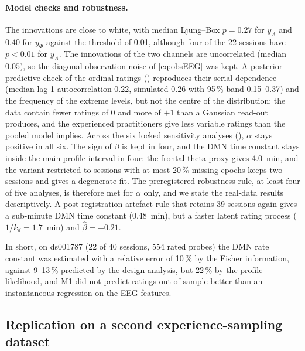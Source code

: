 \documentclass[12pt,a4paper]{article}
\theoremstyle{plain}
\theoremstyle{definition}
\theoremstyle{remark}
\newcommand{\kd}{k_{d}}
\begin{document}
\paragraph{Model checks and robustness.} The innovations are close to white, with median Ljung--Box \citep{Ljung1978} $p=0.27$ for $y_A$ and $0.40$ for $y_\Phi$ against the threshold of 0.01, although four of the 22 sessions have $p<0.01$ for $y_A$. The innovations of the two channels are uncorrelated (median $0.05$), so the diagonal observation noise of \eqref{eq:obsEEG} was kept. A posterior predictive check of the ordinal ratings () reproduces their serial dependence (median lag-1 autocorrelation 0.22, simulated 0.26 with 95\,\% band 0.15--0.37) and the frequency of the extreme levels, but not the centre of the distribution: the data contain fewer ratings of 0 and more of $+1$ than a Gaussian read-out produces, and the experienced practitioners give less variable ratings than the pooled model implies. Across the six locked sensitivity analyses (), $\alpha$ stays positive in all six. The sign of $\beta$ is kept in four, and the DMN time constant stays inside the main profile interval in four: the frontal-theta proxy gives 4.0~min, and the variant restricted to sessions with at most 20\,\% missing epochs keeps two sessions and gives a degenerate fit. The preregistered robustness rule, at least four of five analyses, is therefore met for $\alpha$ only, and we state the real-data results descriptively. A post-registration artefact rule that retains 39 sessions again gives a sub-minute DMN time constant (0.48~min), but a faster latent rating process ($1/\kd=1.7$~min) and $\hat\beta=+0.21$.

In short, on ds001787 (22 of 40 sessions, 554 rated probes) the DMN rate constant was estimated with a relative error of 10\,\% by the Fisher information, against 9--13\,\% predicted by the design analysis, but 22\,\% by the profile likelihood, and M1 did not predict ratings out of sample better than an instantaneous regression on the EEG features.

\subsection{Replication on a second experience-sampling dataset}
\label{sec:res-osf}
\end{document}
